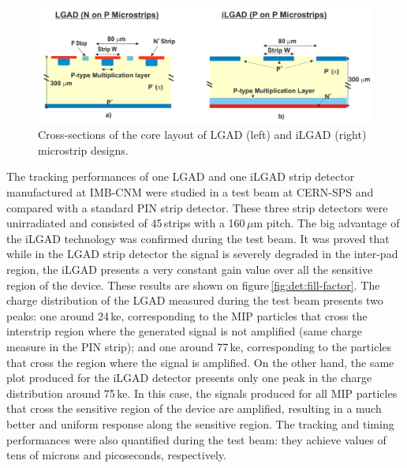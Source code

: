 \begin{figure}[t!]
\centering
\includegraphics[width=1.0\hsize]{Detector/fig/cross-section.png}
\caption{Cross-sections of the core layout of LGAD (left) and iLGAD (right) microstrip designs.}
\label{fig:det:cross-section}
\end{figure}

The tracking performances of one LGAD and one iLGAD strip detector manufactured at IMB-CNM were studied in a test beam at CERN-SPS and compared with a standard PIN strip detector. These three strip detectors were unirradiated and consisted of 45\,strips with a 160\,$\mu$m pitch. 
The big advantage of the iLGAD technology was confirmed during the test beam. It was proved that while in the LGAD strip detector the signal is severely degraded in the inter-pad region, the iLGAD presents a very constant gain value over all the sensitive region of the device. These results are shown on figure\,\ref{fig:det:fill-factor}. The charge distribution of the LGAD measured during the test beam presents two peaks: one around 24\,ke, corresponding to the MIP particles that cross the interstrip region where the generated signal is not amplified (same charge measure in the PIN strip); and one around 77\,ke, corresponding to the particles that cross the region where the signal is amplified. On the other hand, the same plot produced for the iLGAD detector presents only one peak in the charge distribution around 75\,ke. In this case,  the signals produced for all MIP particles that cross the sensitive region of the device are amplified, resulting in a much better and uniform response along the sensitive region. The tracking and timing performances were also quantified during the test beam: they achieve values of tens of microns and picoseconds, respectively.


